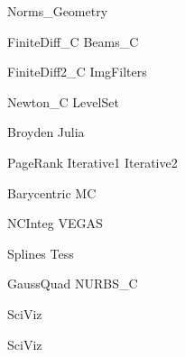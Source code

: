 \documentclass{newsiambook}
\begin{document}
{Norms_Geometry}


{FiniteDiff_C}
{Beams_C}

{FiniteDiff2_C}
{ImgFilters}

{Newton_C}
{LevelSet}

{Broyden}
{Julia}

{PageRank}
{Iterative1}
{Iterative2}






{Barycentric}
{MC}

{NCInteg}
{VEGAS}

{Splines}
{Tess}

{GaussQuad}
{NURBS_C}


\begin{matlab}
{SciViz}
\end{matlab}

\begin{python}
{SciViz}
\end{python}
\end{document}

